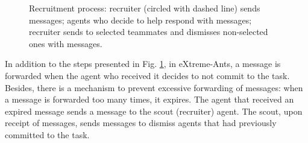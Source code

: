 \begin{figure}[ht]
  \centering

  \caption{Recruitment process:  recruiter (circled with dashed line) sends  messages;  agents who decide to help respond with  messages;  recruiter sends  to selected teammates and dismisses non-selected ones with  messages.}

 \label{fig:auction}
\end{figure}

In addition to the steps presented in Fig. \ref{fig:auction}, in eXtreme-Ants, a  message is forwarded when the agent who received it decides to not commit to the task. Besides, there is a mechanism to prevent excessive forwarding of  messages: when a  message is forwarded too many times, it expires. The agent that received an expired  message sends a  message to the scout (recruiter) agent. The scout, upon receipt of  messages, sends  messages to dismiss agents that had previously committed to the task. 


